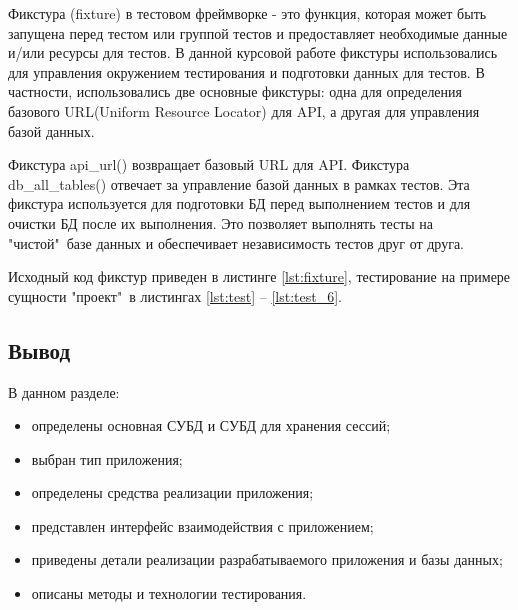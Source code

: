 Фикстура (fixture) в тестовом фреймворке - это функция, которая может быть запущена перед тестом или группой тестов и предоставляет необходимые данные и/или ресурсы для тестов.
В данной курсовой работе фикстуры использовались для управления окружением тестирования и подготовки данных для тестов. В частности, использовались две основные фикстуры: одна для определения базового URL(Uniform Resource Locator) для API, а другая для управления базой данных. 

Фикстура api\_url() возвращает базовый URL для API. 
Фикстура \\db\_all\_tables() отвечает за управление базой данных в рамках тестов. Эта фикстура используется для подготовки БД перед выполнением тестов и для очистки БД после их выполнения. Это позволяет выполнять тесты на "чистой"\ базе данных и обеспечивает независимость тестов друг от друга. 

Исходный код фикстур приведен в листинге \ref{lst:fixture}, тестирование на примере сущности "проект"\ в листингах \ref{lst:test} -- \ref{lst:test_6}.

\subsection*{Вывод}
В данном разделе:

\begin{itemize}[leftmargin=1.6\parindent]
	\item определены основная СУБД и СУБД для хранения сессий;
	\item выбран тип приложения;
	\item определены средства реализации приложения;
	\item представлен интерфейс взаимодействия с приложением;
	\item приведены детали реализации разрабатываемого приложения и базы данных;
	\item описаны методы и технологии тестирования.
\end{itemize}

